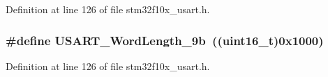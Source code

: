 Definition at line 126 of file stm32f10x\+\_\+usart.\+h.

\subsubsection[{\texorpdfstring{U\+S\+A\+R\+T\+\_\+\+Word\+Length\+\_\+9b}{USART_WordLength_9b}}]{\setlength{\rightskip}{0pt plus 5cm}\#define U\+S\+A\+R\+T\+\_\+\+Word\+Length\+\_\+9b~(({\bf uint16\+\_\+t})0x1000)}\hypertarget{group___u_s_a_r_t___word___length_gae7dd162142660e09e2321aa3f33dc4d2}{}\label{group___u_s_a_r_t___word___length_gae7dd162142660e09e2321aa3f33dc4d2}


Definition at line 126 of file stm32f10x\+\_\+usart.\+h.

